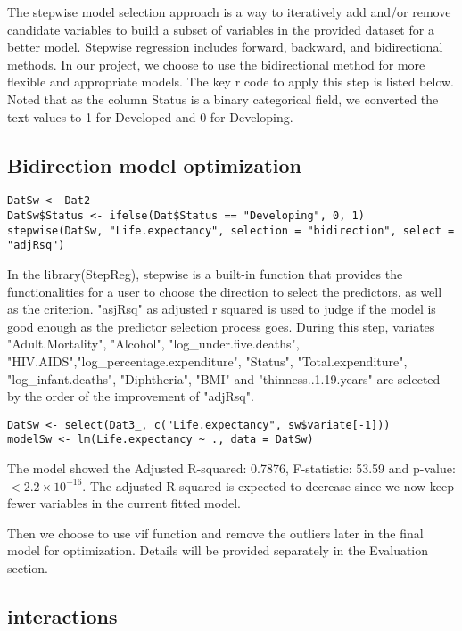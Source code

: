 The stepwise model selection approach is a way to iteratively add and/or remove candidate variables to build a subset of variables in the provided dataset for a better model. Stepwise regression includes forward, backward, and bidirectional methods. In our project, we choose to use the bidirectional method for more flexible and appropriate models. The key r code to apply this step is listed below. Noted that as the column Status is a binary categorical field, we converted the text values to 1 for Developed and 0 for Developing.

\subsection{Bidirection model optimization}

\begin{verbatim}
DatSw <- Dat2
DatSw$Status <- ifelse(Dat$Status == "Developing", 0, 1)
stepwise(DatSw, "Life.expectancy", selection = "bidirection", select = "adjRsq")
\end{verbatim}

In the library(StepReg), stepwise is a built-in function that provides the functionalities for a user to choose the direction to select the predictors, as well as the criterion. "asjRsq" as adjusted r squared is used to judge if the model is good enough as the predictor selection process goes. During this step, variates "Adult.Mortality", "Alcohol", "log_under.five.deaths", "HIV.AIDS","log_percentage.expenditure", "Status", "Total.expenditure", "log\_infant.deaths", "Diphtheria", "BMI" and "thinness..1.19.years" are selected by the order of the improvement of "adjRsq".

\begin{verbatim}
DatSw <- select(Dat3_, c("Life.expectancy", sw$variate[-1]))
modelSw <- lm(Life.expectancy ~ ., data = DatSw)
\end{verbatim}

The model showed the Adjusted R-squared:  0.7876, F-statistic: 53.59 and p-value: $< 2.2\times 10^{-16}$. The adjusted R squared is expected to decrease since we now keep fewer variables in the current fitted model.

Then we choose to use vif function and remove the outliers later in the final model for optimization. Details will be provided separately in the Evaluation section. 

\subsection{interactions}

